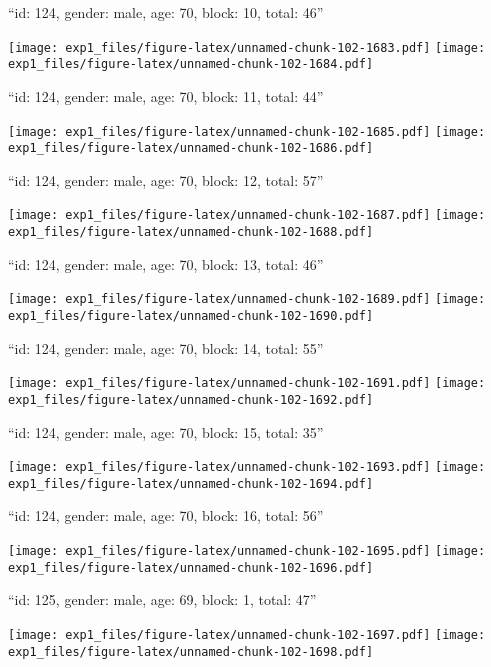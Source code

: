 \documentclass[11pt,,]{article}
\begin{document}
\newpage
[1] 

``id: 124, gender: male, age: 70, block: 10, total: 46''

\texttt{[image: exp1\_files/figure-latex/unnamed-chunk-102-1683.pdf]}
\texttt{[image: exp1\_files/figure-latex/unnamed-chunk-102-1684.pdf]}

\newpage
[1] 

``id: 124, gender: male, age: 70, block: 11, total: 44''

\texttt{[image: exp1\_files/figure-latex/unnamed-chunk-102-1685.pdf]}
\texttt{[image: exp1\_files/figure-latex/unnamed-chunk-102-1686.pdf]}

\newpage
[1] 

``id: 124, gender: male, age: 70, block: 12, total: 57''

\texttt{[image: exp1\_files/figure-latex/unnamed-chunk-102-1687.pdf]}
\texttt{[image: exp1\_files/figure-latex/unnamed-chunk-102-1688.pdf]}

\newpage
[1] 

``id: 124, gender: male, age: 70, block: 13, total: 46''

\texttt{[image: exp1\_files/figure-latex/unnamed-chunk-102-1689.pdf]}
\texttt{[image: exp1\_files/figure-latex/unnamed-chunk-102-1690.pdf]}

\newpage
[1] 

``id: 124, gender: male, age: 70, block: 14, total: 55''

\texttt{[image: exp1\_files/figure-latex/unnamed-chunk-102-1691.pdf]}
\texttt{[image: exp1\_files/figure-latex/unnamed-chunk-102-1692.pdf]}

\newpage
[1] 

``id: 124, gender: male, age: 70, block: 15, total: 35''

\texttt{[image: exp1\_files/figure-latex/unnamed-chunk-102-1693.pdf]}
\texttt{[image: exp1\_files/figure-latex/unnamed-chunk-102-1694.pdf]}

\newpage
[1] 

``id: 124, gender: male, age: 70, block: 16, total: 56''

\texttt{[image: exp1\_files/figure-latex/unnamed-chunk-102-1695.pdf]}
\texttt{[image: exp1\_files/figure-latex/unnamed-chunk-102-1696.pdf]}

\newpage
[1] 

``id: 125, gender: male, age: 69, block: 1, total: 47''

\texttt{[image: exp1\_files/figure-latex/unnamed-chunk-102-1697.pdf]}
\texttt{[image: exp1\_files/figure-latex/unnamed-chunk-102-1698.pdf]}
\end{document}
